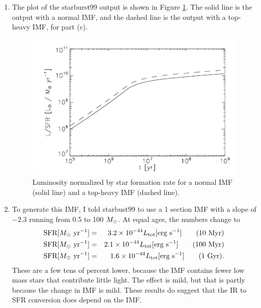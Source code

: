 \begin{enumerate}
\begin{enumerate}
\item
The plot of the starburst99 output is shown in Figure \ref{fig:hw1sol1}. The solid line is the output with a normal IMF, and the dashed line is the output with a top-heavy IMF, for part (c).

\begin{figure}
\includegraphics[width=\linewidth]{graphics/hw1sol1}
\caption[Solution to problem set~\thesolutionset, problem~\theenumi\theenumii]{
\label{fig:hw1sol1}
Luminosity normalized by star formation rate for a normal IMF (solid line) and a top-heavy IMF (dashed line).
}
\end{figure}

\item To generate this IMF, I told starbust99 to use a 1 section IMF with a slope of $-2.3$ running from 0.5 to 100 $M_{\odot}$. At equal ages, the numbers change to
\begin{eqnarray*}
\mbox{SFR}[M_{\odot}\mbox{ yr}^{-1}] & = & 3.2\times 10^{-44} L_{\rm tot}[\mbox{erg s}^{-1}]\qquad\mbox{(10 Myr)} \\
\mbox{SFR}[M_{\odot}\mbox{ yr}^{-1}] & = & 2.1\times 10^{-44} L_{\rm tot}[\mbox{erg s}^{-1}]\qquad\mbox{(100 Myr)} \\
\mbox{SFR}[M_{\odot}\mbox{ yr}^{-1}] & = & 1.6\times 10^{-44} L_{\rm tot}[\mbox{erg s}^{-1}]\qquad\mbox{(1 Gyr)}.
\end{eqnarray*}
These are a few tens of percent lower, because the IMF contains fewer low mass stars that contribute little light. The effect is mild, but that is partly because the change in IMF is mild. These results do suggest that the IR to SFR conversion does depend on the IMF.

\end{enumerate}

\end{enumerate}
